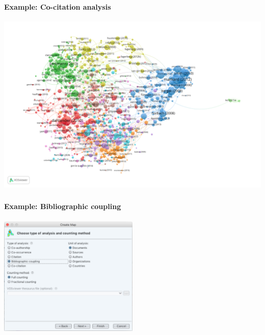 \documentclass[8pt]{beamer}
\begin{document}
\begin{frame}
\frametitle{\insertsection}
\framesubtitle{Example: Co-citation analysis}

\centering
\includegraphics[height = 0.8\textheight]{RP_20082018_cocitation}

\end{frame}



\begin{frame}
\frametitle{\insertsection}
\framesubtitle{Example: Bibliographic coupling}

\centering
\includegraphics[width= 0.5\textwidth]{vosbiblio}

\end{frame}

\end{document}
